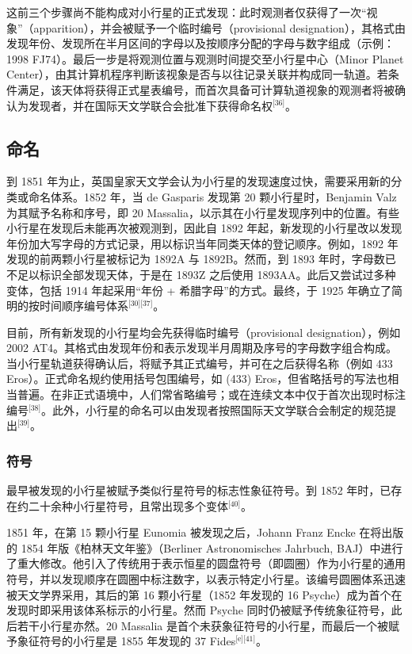 这前三个步骤尚不能构成对小行星的正式发现：此时观测者仅获得了一次“视象”（apparition），并会被赋予一个临时编号（provisional designation），其格式由发现年份、发现所在半月区间的字母以及按顺序分配的字母与数字组成（示例：1998 FJ74）。最后一步是将观测位置与观测时间提交至小行星中心（Minor Planet Center），由其计算机程序判断该视象是否与以往记录关联并构成同一轨道。若条件满足，该天体将获得正式星表编号，而首次具备可计算轨道视象的观测者将被确认为发现者，并在国际天文学联合会批准下获得命名权\(^\text{[36]}\)。
\subsection{命名}
到 1851 年为止，英国皇家天文学会认为小行星的发现速度过快，需要采用新的分类或命名体系。1852 年，当 de Gasparis 发现第 20 颗小行星时，Benjamin Valz 为其赋予名称和序号，即 20 Massalia，以示其在小行星发现序列中的位置。有些小行星在发现后未能再次被观测到，因此自 1892 年起，新发现的小行星改以发现年份加大写字母的方式记录，用以标识当年同类天体的登记顺序。例如，1892 年发现的前两颗小行星被标记为 1892A 与 1892B。然而，到 1893 年时，字母数已不足以标识全部发现天体，于是在 1893Z 之后使用 1893AA。此后又尝试过多种变体，包括 1914 年起采用“年份 + 希腊字母”的方式。最终，于 1925 年确立了简明的按时间顺序编号体系\(^\text{[30][37]}\)。

目前，所有新发现的小行星均会先获得临时编号（provisional designation），例如 2002 AT4。其格式由发现年份和表示发现半月周期及序号的字母数字组合构成。当小行星轨道获得确认后，将赋予其正式编号，并可在之后获得名称（例如 433 Eros）。正式命名规约使用括号包围编号，如 (433) Eros，但省略括号的写法也相当普遍。在非正式语境中，人们常省略编号；或在连续文本中仅于首次出现时标注编号\(^\text{[38]}\)。此外，小行星的命名可以由发现者按照国际天文学联合会制定的规范提出\(^\text{[39]}\)。
\subsubsection{符号}  
最早被发现的小行星被赋予类似行星符号的标志性象征符号。到 1852 年时，已存在约二十余种小行星符号，且常出现多个变体\(^\text{[40]}\)。

1851 年，在第 15 颗小行星 Eunomia 被发现之后，Johann Franz Encke 在将出版的 1854 年版《柏林天文年鉴》（Berliner Astronomisches Jahrbuch, BAJ）中进行了重大修改。他引入了传统用于表示恒星的圆盘符号（即圆圈）作为小行星的通用符号，并以发现顺序在圆圈中标注数字，以表示特定小行星。该编号圆圈体系迅速被天文学界采用，其后的第 16 颗小行星（1852 年发现的 16 Psyche）成为首个在发现时即采用该体系标示的小行星。然而 Psyche 同时仍被赋予传统象征符号，此后若干小行星亦然。20 Massalia 是首个未获象征符号的小行星，而最后一个被赋予象征符号的小行星是 1855 年发现的 37 Fides\(^\text{[e][41]}\)。

